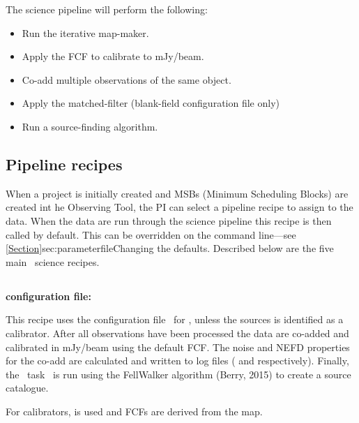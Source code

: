 The science pipeline will perform the following:
\vspace{-0.3cm}
\begin{itemize}\itemsep-0.3em
\item Run the iterative map-maker.
\item Apply the FCF to calibrate to mJy/beam.
\item Co-add multiple observations of the same object.
\item Apply the matched-filter (blank-field configuration file only)
\item Run a source-finding algorithm.
\end{itemize}

\subsection{Pipeline recipes}
\label{sec:recipes}

When a project is initially created and MSBs (Minimum Scheduling Blocks)
are created int he Observing Tool, the PI can select a pipeline recipe to assign
to the data. When the data are run through the science pipeline this
recipe is then called by default. This can be overridden on the command
line---see \cref{Section}{sec:parameterfile}{Changing the defaults}.
Described below are the five main \oracdr\ science recipes.

\subsection{}

\textbf{configuration file: }

This recipe uses the configuration file \jsageneric\ for \makemap, unless
the sources is identified as a calibrator. After all observations have
been processed the data are co-added and calibrated in mJy/beam using
the default FCF. The noise and NEFD properties for the co-add are
calculated and written to log files ( and
 respectively). Finally, the \cupid\ task \findclumps\
is run using the FellWalker algorithm (Berry, 2015\cite{fellwalker}) to
create a source catalogue.

For calibrators,  is used and
FCFs are derived from the map.


\subsection{}

